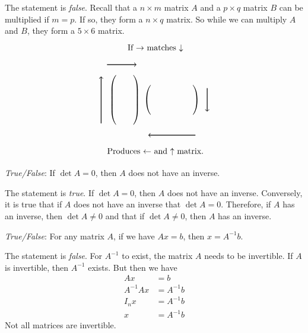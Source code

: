 \documentclass[11pt,letterpaper]{article}
\begin{document}
\sol The statement is \textit{false}. Recall that a $n \times m$ matrix $A$ and a $p \times q$ matrix $B$ can be multiplied if $m= p$. If so, they form a $n \times q$ matrix. So while we can multiply $A$ and $B$, they form a $5 \times 6$ matrix. 
	\[
	\begin{tikzpicture}
	\node at (1.3,2.2) {If $\to$ matches $\downarrow$};
	\node at (1.3,-2.2) {Produces $\leftarrow$ and $\uparrow$ matrix.};
	
	\draw[->,line width=0.03cm] (-0.75,1.5) -- (0.50,1.5);
	\draw[->,line width=0.03cm] (3.5,0.5) -- (3.5,-0.5);
	
	\draw[->,line width=0.03cm] (3,-1.5) -- (1,-1.5);
	\draw[->,line width=0.03cm] (-1,-1) -- (-1,1);
	
	\node at (0,0) {$\begin{pmatrix} &&\\&&\\&&\\&&\\&& \end{pmatrix}$};
	\node at (2,0) {$\begin{pmatrix} &&&&& \\ &&&&& \\ &&&&& \end{pmatrix}$};
	\end{tikzpicture}
	\] \pvspace{1.5cm}



\quizsol \textit{True/False}: If $\det A= 0$, then $A$ does not have an inverse. \pspace

\sol The statement is \textit{true}. If $\det A= 0$, then $A$ does not have an inverse. Conversely, it is true that if $A$ does not have an inverse that $\det A= 0$. Therefore, if $A$ has an inverse, then $\det A \neq 0$ and that if $\det A \neq 0$, then $A$ has an inverse. \pspace



\quizsol \textit{True/False}: For any matrix $A$, if we have $Ax= b$, then $x= A^{-1}b$. \pspace

\sol The statement is \textit{false}. For $A^{-1}$ to exist, the matrix $A$ needs to be invertible. If $A$ is invertible, then $A^{-1}$ exists. But then we have
	\[
	\begin{aligned}
	Ax&= b \\
	A^{-1}Ax&= A^{-1}b \\
	I_nx&= A^{-1}b \\
	x&= A^{-1}b
	\end{aligned}
	\]
Not all matrices are invertible. 
\end{document}
